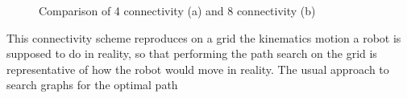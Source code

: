 \begin{figure}[H]
     \centering
     \hfill
     \caption{Comparison of 4 connectivity (a) and 8 connectivity (b)}
     \label{steady_state}
\end{figure}
This connectivity scheme reproduces on a grid the kinematics motion a robot is supposed to do in reality, so that performing the path search on the grid is representative of how the robot would move in reality. 
The usual approach to search graphs for the optimal path 
